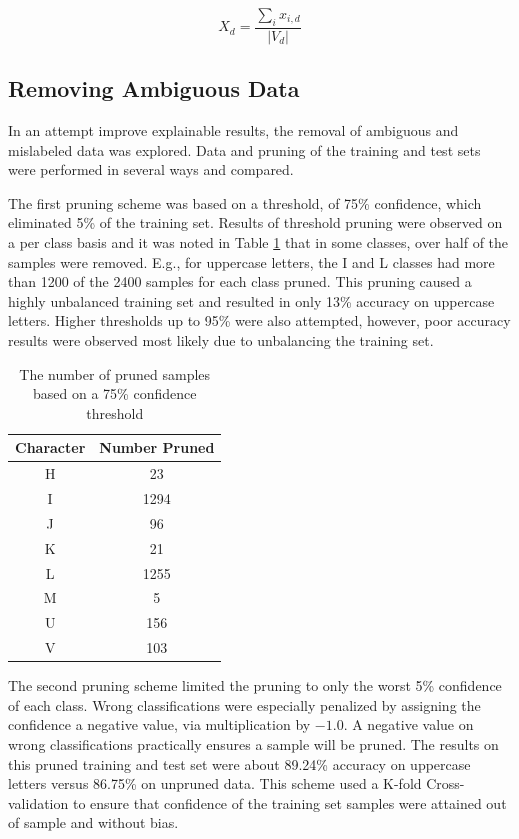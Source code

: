 \documentclass[conference]{IEEEtran}
\begin{document}
\begin{equation}
    X_d=\frac{\sum_i x_{i,d}}{|V_d|}
    \label{eq:explainability}
\end{equation}

\subsection{Removing Ambiguous Data}

In an attempt improve explainable results, the removal of ambiguous and
mislabeled data was explored. Data and pruning of the training and test sets
were performed in several ways and compared.

The first pruning scheme was based on a threshold, of 75\% confidence, which
eliminated 5\% of the training set. Results of threshold pruning were observed
on a per class basis and it was noted in Table \ref{tab_threshold_pruning_qty}
that in some classes, over half of the samples were removed.  E.g., for
uppercase letters, the I and L classes had more than 1200 of the 2400 samples
for each class pruned. This pruning caused a highly unbalanced training set and
resulted in only 13\% accuracy on uppercase letters.  Higher thresholds up to
95\% were also attempted, however, poor accuracy results were observed most
likely due to unbalancing the training set.

\begin{table}
    \centering
    \caption{The number of pruned samples based on a 75\% confidence threshold}
    \begin{tabular}{|c|c|}
        \hline
        Character & Number Pruned \\
        \hline
        \hline
        H & 23 \\
        I & 1294 \\
        J & 96 \\
        K & 21 \\
        L & 1255 \\
        M & 5 \\
        U & 156 \\
        V & 103 \\
        \hline
    \end{tabular}
    \label{tab_threshold_pruning_qty}
\end{table}

The second pruning scheme limited the pruning to only the worst 5\% confidence
of each class. Wrong classifications were especially penalized by assigning the
confidence a negative value, via multiplication by $-1.0$.  A negative value on
wrong classifications practically ensures a sample will be pruned. The results on
this pruned training and test set were about 89.24\% accuracy on uppercase letters
versus 86.75\% on unpruned data.  This scheme used a K-fold Cross-validation to
ensure that confidence of the training set samples were attained out of sample
and without bias.
\end{document}
